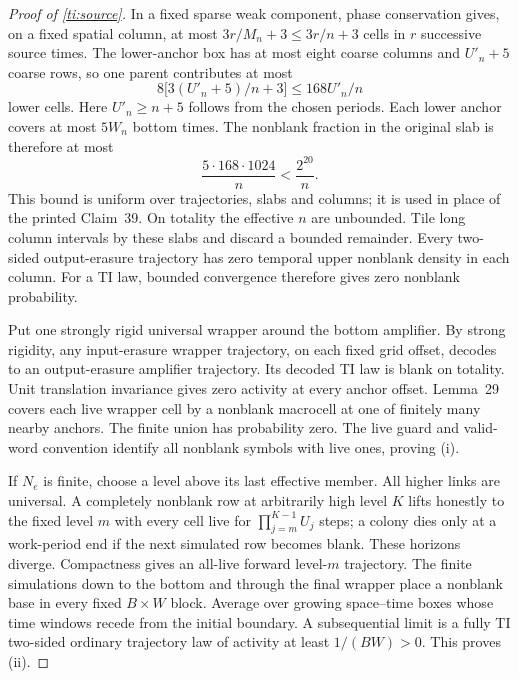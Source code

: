 \begin{proof}[Proof of \cref{ti:source}]
In a fixed sparse weak component, phase conservation gives, on a fixed spatial column, at most $3r/M_n+3\le3r/n+3$ cells in $r$ successive source times. The lower-anchor box has at most eight coarse columns and $U'_n+5$ coarse rows, so one parent contributes at most
\[
 8\bigl[3(U'_n+5)/n+3\bigr]\le168U'_n/n
\]
lower cells. Here $U'_n\ge n+5$ follows from the chosen periods. Each lower anchor covers at most $5W_n$ bottom times. The nonblank fraction in the original slab is therefore at most
\[
 \frac{5\cdot168\cdot1024}{n}<\frac{2^{20}}n.
\]
This bound is uniform over trajectories, slabs and columns; it is used in place of the printed Claim~39. On totality the effective $n$ are unbounded. Tile long column intervals by these slabs and discard a bounded remainder. Every two-sided output-erasure trajectory has zero temporal upper nonblank density in each column. For a TI law, bounded convergence therefore gives zero nonblank probability.

Put one strongly rigid universal wrapper around the bottom amplifier. By strong rigidity, any input-erasure wrapper trajectory, on each fixed grid offset, decodes to an output-erasure amplifier trajectory. Its decoded TI law is blank on totality. Unit translation invariance gives zero activity at every anchor offset. Lemma~29 covers each live wrapper cell by a nonblank macrocell at one of finitely many nearby anchors. The finite union has probability zero. The live guard and valid-word convention identify all nonblank symbols with live ones, proving (i).

If $N_e$ is finite, choose a level above its last effective member. All higher links are universal. A completely nonblank row at arbitrarily high level $K$ lifts honestly to the fixed level $m$ with every cell live for $\prod_{j=m}^{K-1}U_j$ steps; a colony dies only at a work-period end if the next simulated row becomes blank. These horizons diverge. Compactness gives an all-live forward level-$m$ trajectory. The finite simulations down to the bottom and through the final wrapper place a nonblank base in every fixed $B\times W$ block. Average over growing space--time boxes whose time windows recede from the initial boundary. A subsequential limit is a fully TI two-sided ordinary trajectory law of activity at least $1/(BW)>0$. This proves (ii).
\end{proof}
